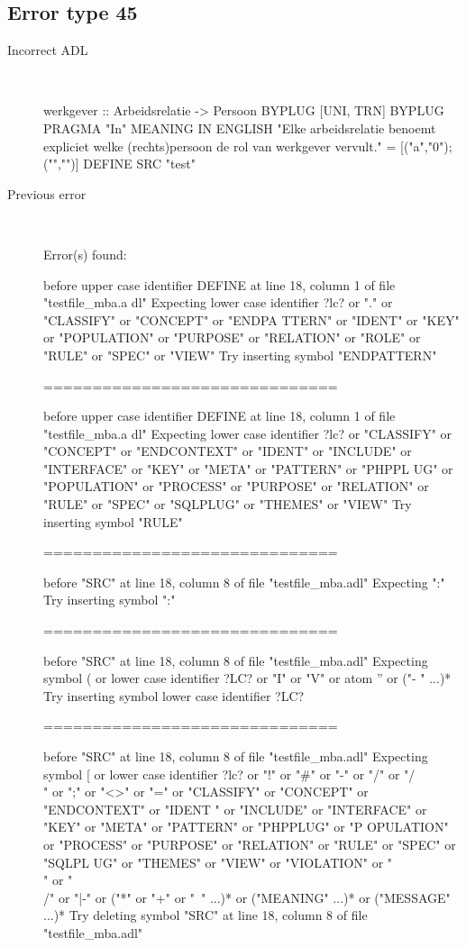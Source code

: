 \hrulefill

\subsection{Error type 45}
  \begin{description}
  \item[Incorrect ADL]~\\
\begin{adl}
werkgever :: Arbeidsrelatie -> Persoon 
BYPLUG [UNI, TRN] BYPLUG
PRAGMA "In"
MEANING IN ENGLISH "Elke arbeidsrelatie benoemt expliciet welke (rechts)persoon de rol van werkgever vervult."
= [("a","0");("","")]
DEFINE SRC "test"\end{adl}
  \item[Previous error]~\\
\begin{haskell}
Error(s) found:

before upper case identifier DEFINE at line 18, column 1 of file "testfile_mba.a
dl"
Expecting lower case identifier ?lc? or "." or "CLASSIFY" or "CONCEPT" or "ENDPA
TTERN" or "IDENT" or "KEY" or "POPULATION" or "PURPOSE" or "RELATION" or "ROLE"
or "RULE" or "SPEC" or "VIEW"
Try inserting symbol "ENDPATTERN"

==============================

before upper case identifier DEFINE at line 18, column 1 of file "testfile_mba.a
dl"
Expecting lower case identifier ?lc? or "CLASSIFY" or "CONCEPT" or "ENDCONTEXT"
or "IDENT" or "INCLUDE" or "INTERFACE" or "KEY" or "META" or "PATTERN" or "PHPPL
UG" or "POPULATION" or "PROCESS" or "PURPOSE" or "RELATION" or "RULE" or "SPEC"
or "SQLPLUG" or "THEMES" or "VIEW"
Try inserting symbol "RULE"

==============================

before "SRC" at line 18, column 8 of file "testfile_mba.adl"
Expecting ":"
Try inserting symbol ":"

==============================

before "SRC" at line 18, column 8 of file "testfile_mba.adl"
Expecting symbol ( or lower case identifier ?LC? or "I" or "V" or atom '' or ("-
" ...)*
Try inserting symbol lower case identifier ?LC?

==============================

before "SRC" at line 18, column 8 of file "testfile_mba.adl"
Expecting symbol [ or lower case identifier ?lc? or "!" or "#" or "-" or "/" or
"/\\" or ";" or "<>" or "=" or "CLASSIFY" or "CONCEPT" or "ENDCONTEXT" or "IDENT
" or "INCLUDE" or "INTERFACE" or "KEY" or "META" or "PATTERN" or "PHPPLUG" or "P
OPULATION" or "PROCESS" or "PURPOSE" or "RELATION" or "RULE" or "SPEC" or "SQLPL
UG" or "THEMES" or "VIEW" or "VIOLATION" or "\\" or "\\/" or "|-" or ("*" or "+"
 or "~" ...)* or ("MEANING" ...)* or ("MESSAGE" ...)*
Try deleting symbol "SRC" at line 18, column 8 of file "testfile_mba.adl"


\end{haskell}
\end{description}
